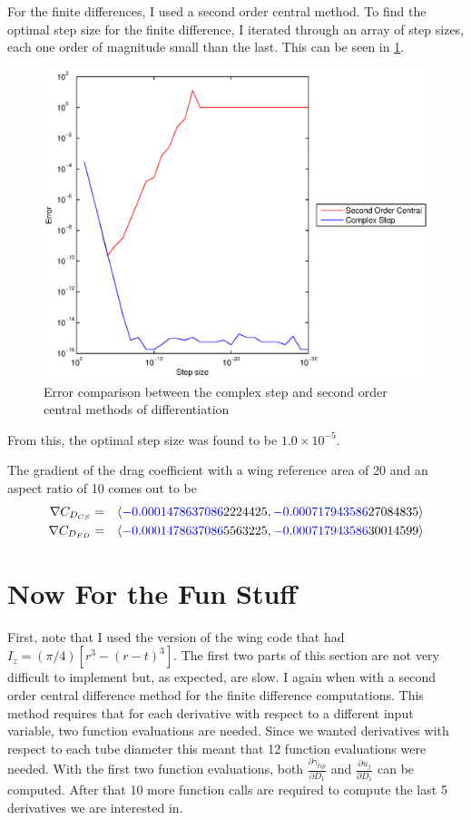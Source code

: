 \documentclass[12pt,parskip=full]{article}
\numberwithin{subsection}{section}
\begin{document}
		For the finite differences, I used a second order central method. To find the optimal step size for the finite difference, I iterated
		through an array of step sizes, each one order of magnitude small than the last. This can be seen in \cref{fig:DerErr}.
		\begin{figure}[!ht]
			\centering
			\includegraphics[scale = 0.7]{DerivativeError.eps}
			\caption{Error comparison between the complex step and second order central methods of differentiation}\label{fig:DerErr}
		\end{figure}
		From this, the optimal step size was found to be $1.0\times 10^{-5}$.
		
		The gradient of the drag coefficient with a wing reference area of 20 and an aspect ratio of 10 comes out to be
		\begin{eqnarray*}
			\nabla C_{D_{CS}} &=& \left\langle \textcolor{blue}{-0.0001478637086}2224425, \textcolor{blue}{-0.000717943586}27084835 \right\rangle \\
			\nabla C_{D_{FD}} &=& \left\langle \textcolor{blue}{-0.0001478637086}5563225, \textcolor{blue}{-0.000717943586}30014599 \right\rangle
		\end{eqnarray*}

	\section{Now For the Fun Stuff}
	
		First, note that I used the version of the wing code that had $I_z = (\pi/4)[r^3 - (r-t)^3]$. The first two parts of
		this section are not very difficult to implement but, as expected, are slow. I again when with a second order central difference method
		for the finite difference computations. This method requires that for each derivative with respect to a different input variable, two 
		function evaluations are needed. Since we wanted derivatives with respect to each tube diameter this meant that 12 function evaluations
		were needed. With the first two function evaluations, both $\frac{\partial\gamma_{tip}}{\partial D_1}$ and $\frac{\partial u_j}{\partial D_1}$
		can be computed. After that 10 more function calls are required to compute the last 5 derivatives we are interested in.
		
\end{document}
